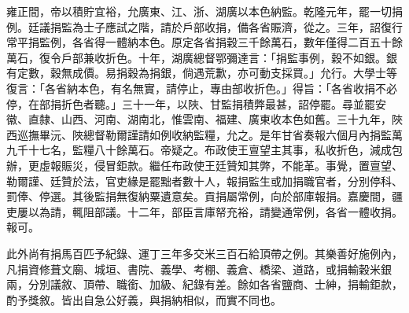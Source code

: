 \begin{pinyinscope}
雍正間，帝以積貯宜裕，允廣東、江、浙、湖廣以本色納監。乾隆元年，罷一切捐例。廷議捐監為士子應試之階，請於戶部收捐，備各省賑濟，從之。三年，詔復行常平捐監例，各省得一體納本色。原定各省捐穀三千餘萬石，數年僅得二百五十餘萬石，復令戶部兼收折色。十年，湖廣總督鄂彌達言：「捐監事例，穀不如銀。銀有定數，穀無成價。易捐穀為捐銀，倘遇荒歉，亦可動支採買。」允行。大學士等復言：「各省納本色，有名無實，請停止，專由部收折色。」得旨：「各省收捐不必停，在部捐折色者聽。」三十一年，以陜、甘監捐積弊最甚，詔停罷。尋並罷安徽、直隸、山西、河南、湖南北，惟雲南、福建、廣東收本色如舊。三十九年，陜西巡撫畢沅、陜總督勒爾謹請如例收納監糧，允之。是年甘省奏報六個月內捐監萬九千十七名，監糧八十餘萬石。帝疑之。布政使王亶望主其事，私收折色，減成包辦，更虛報賑災，侵冒鉅款。繼任布政使王廷贊知其弊，不能革。事覺，置亶望、勒爾謹、廷贊於法，官吏緣是罷黜者數十人，報捐監生或加捐職官者，分別停科、罰俸、停選。其後監捐無復納粟遺意矣。貢捐屬常例，向於部庫報捐。嘉慶間，疆吏屢以為請，輒阻部議。十二年，部臣言庫帑充裕，請變通常例，各省一體收捐。報可。

此外尚有捐馬百匹予紀錄、運丁三年多交米三百石給頂帶之例。其樂善好施例內，凡捐資修葺文廟、城垣、書院、義學、考棚、義倉、橋梁、道路，或捐輸穀米銀兩，分別議敘、頂帶、職銜、加級、紀錄有差。餘如各省鹽商、士紳，捐輸鉅款，酌予獎敘。皆出自急公好義，與捐納相似，而實不同也。


\end{pinyinscope}